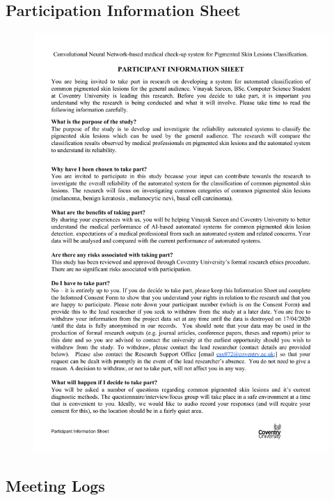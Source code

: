 \subsection*{Participation Information Sheet}
\begin{figure}[!htp]
    \centering
    \includegraphics[width=12cm]{Documents/participation.pdf}
\end{figure}
\pagebreak
\subsection*{Meeting Logs}
